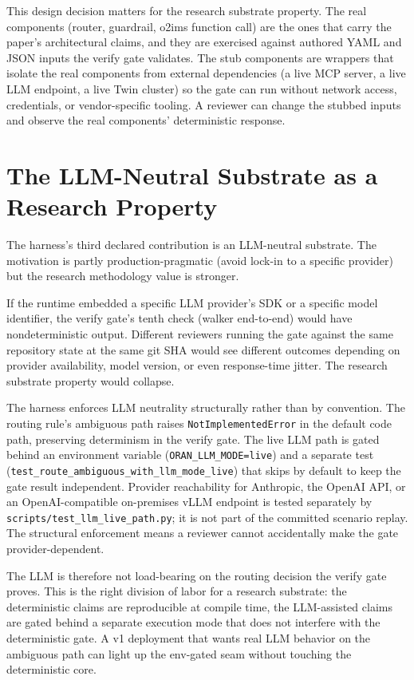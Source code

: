 \documentclass[twocolumn,10pt,a4paper]{article}
\begin{document}
This design decision matters for the research substrate property. The real components (router, guardrail, o2ims function call) are the ones that carry the paper's architectural claims, and they are exercised against authored YAML and JSON inputs the verify gate validates. The stub components are wrappers that isolate the real components from external dependencies (a live MCP server, a live LLM endpoint, a live Twin cluster) so the gate can run without network access, credentials, or vendor-specific tooling. A reviewer can change the stubbed inputs and observe the real components' deterministic response.

\section{The LLM-Neutral Substrate as a Research Property}
\label{sec:llm}

The harness's third declared contribution is an LLM-neutral substrate. The motivation is partly production-pragmatic (avoid lock-in to a specific provider) but the research methodology value is stronger.

If the runtime embedded a specific LLM provider's SDK or a specific model identifier, the verify gate's tenth check (walker end-to-end) would have nondeterministic output. Different reviewers running the gate against the same repository state at the same git SHA would see different outcomes depending on provider availability, model version, or even response-time jitter. The research substrate property would collapse.

The harness enforces LLM neutrality structurally rather than by convention. The routing rule's ambiguous path raises \texttt{NotImplementedError} in the default code path, preserving determinism in the verify gate. The live LLM path is gated behind an environment variable (\texttt{ORAN\_LLM\_MODE=live}) and a separate test (\texttt{test\_route\_ambiguous\_with\_llm\_mode\_live}) that skips by default to keep the gate result independent. Provider reachability for Anthropic, the OpenAI API, or an OpenAI-compatible on-premises vLLM endpoint is tested separately by \texttt{scripts/test\_llm\_live\_path.py}; it is not part of the committed scenario replay. The structural enforcement means a reviewer cannot accidentally make the gate provider-dependent.

The LLM is therefore not load-bearing on the routing decision the verify gate proves. This is the right division of labor for a research substrate: the deterministic claims are reproducible at compile time, the LLM-assisted claims are gated behind a separate execution mode that does not interfere with the deterministic gate. A v1 deployment that wants real LLM behavior on the ambiguous path can light up the env-gated seam without touching the deterministic core.
\end{document}
